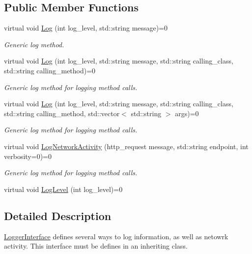\subsection*{Public Member Functions}
\begin{DoxyCompactItemize}
\item 
virtual void \mbox{\hyperlink{classcadg__rest_1_1_logger_interface_a56f53c1fb9687825ade3acced5e3a10a}{Log}} (int log\+\_\+level, std\+::string message)=0
\begin{DoxyCompactList}\small\item\em Generic log method. \end{DoxyCompactList}\item 
virtual void \mbox{\hyperlink{classcadg__rest_1_1_logger_interface_afe3de82598193daa3442818c242132b0}{Log}} (int log\+\_\+level, std\+::string message, std\+::string calling\+\_\+class, std\+::string calling\+\_\+method)=0
\begin{DoxyCompactList}\small\item\em Generic log method for logging method calls. \end{DoxyCompactList}\item 
virtual void \mbox{\hyperlink{classcadg__rest_1_1_logger_interface_a582588ac8434b5edc32eb03da37a1874}{Log}} (int log\+\_\+level, std\+::string message, std\+::string calling\+\_\+class, std\+::string calling\+\_\+method, std\+::vector$<$ std\+::string $>$ args)=0
\begin{DoxyCompactList}\small\item\em Generic log method for logging method calls. \end{DoxyCompactList}\item 
virtual void \mbox{\hyperlink{classcadg__rest_1_1_logger_interface_a9f3648fc2c6d697e80961041a40d2e24}{Log\+Network\+Activity}} (http\+\_\+request message, std\+::string endpoint, int verbosity=0)=0
\begin{DoxyCompactList}\small\item\em Generic log method for logging method calls. \end{DoxyCompactList}\item 
virtual void \mbox{\hyperlink{classcadg__rest_1_1_logger_interface_a9b1afaa12201781dc8c8cb782994db29}{Log\+Level}} (int log\+\_\+level)=0
\end{DoxyCompactItemize}


\subsection{Detailed Description}
\mbox{\hyperlink{classcadg__rest_1_1_logger_interface}{Logger\+Interface}} defines several ways to log information, as well as netowrk activity. This interface must be defines in an inheriting class. 

